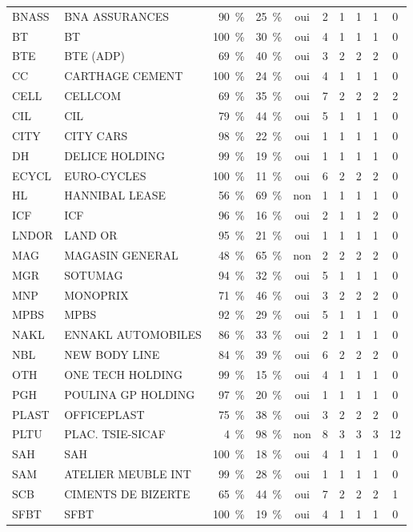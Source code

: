 \documentclass[11pt,a4paper]{article}
\begin{document}
{\begin{longtable}{llrrcccccc}
BNASS & BNA ASSURANCES & 90~\% & 25~\% & oui & 2 & 1 & 1 & 1 & 0 \\
BT & BT & 100~\% & 30~\% & oui & 4 & 1 & 1 & 1 & 0 \\
BTE & BTE (ADP) & 69~\% & 40~\% & oui & 3 & 2 & 2 & 2 & 0 \\
CC & CARTHAGE CEMENT & 100~\% & 24~\% & oui & 4 & 1 & 1 & 1 & 0 \\
CELL & CELLCOM & 69~\% & 35~\% & oui & 7 & 2 & 2 & 2 & 2 \\
CIL & CIL & 79~\% & 44~\% & oui & 5 & 1 & 1 & 1 & 0 \\
CITY & CITY CARS & 98~\% & 22~\% & oui & 1 & 1 & 1 & 1 & 0 \\
DH & DELICE HOLDING & 99~\% & 19~\% & oui & 1 & 1 & 1 & 1 & 0 \\
ECYCL & EURO-CYCLES & 100~\% & 11~\% & oui & 6 & 2 & 2 & 2 & 0 \\
HL & HANNIBAL LEASE & 56~\% & 69~\% & non & 1 & 1 & 1 & 1 & 0 \\
ICF & ICF & 96~\% & 16~\% & oui & 2 & 1 & 1 & 2 & 0 \\
LNDOR & LAND OR & 95~\% & 21~\% & oui & 1 & 1 & 1 & 1 & 0 \\
MAG & MAGASIN GENERAL & 48~\% & 65~\% & non & 2 & 2 & 2 & 2 & 0 \\
MGR & SOTUMAG & 94~\% & 32~\% & oui & 5 & 1 & 1 & 1 & 0 \\
MNP & MONOPRIX & 71~\% & 46~\% & oui & 3 & 2 & 2 & 2 & 0 \\
MPBS & MPBS & 92~\% & 29~\% & oui & 5 & 1 & 1 & 1 & 0 \\
NAKL & ENNAKL AUTOMOBILES & 86~\% & 33~\% & oui & 2 & 1 & 1 & 1 & 0 \\
NBL & NEW BODY LINE & 84~\% & 39~\% & oui & 6 & 2 & 2 & 2 & 0 \\
OTH & ONE TECH HOLDING & 99~\% & 15~\% & oui & 4 & 1 & 1 & 1 & 0 \\
PGH & POULINA GP HOLDING & 97~\% & 20~\% & oui & 1 & 1 & 1 & 1 & 0 \\
PLAST & OFFICEPLAST & 75~\% & 38~\% & oui & 3 & 2 & 2 & 2 & 0 \\
PLTU & PLAC. TSIE-SICAF & 4~\% & 98~\% & non & 8 & 3 & 3 & 3 & 12 \\
SAH & SAH & 100~\% & 18~\% & oui & 4 & 1 & 1 & 1 & 0 \\
SAM & ATELIER MEUBLE INT & 99~\% & 28~\% & oui & 1 & 1 & 1 & 1 & 0 \\
SCB & CIMENTS DE BIZERTE & 65~\% & 44~\% & oui & 7 & 2 & 2 & 2 & 1 \\
SFBT & SFBT & 100~\% & 19~\% & oui & 4 & 1 & 1 & 1 & 0 \\

\end{longtable}}
\end{document}
